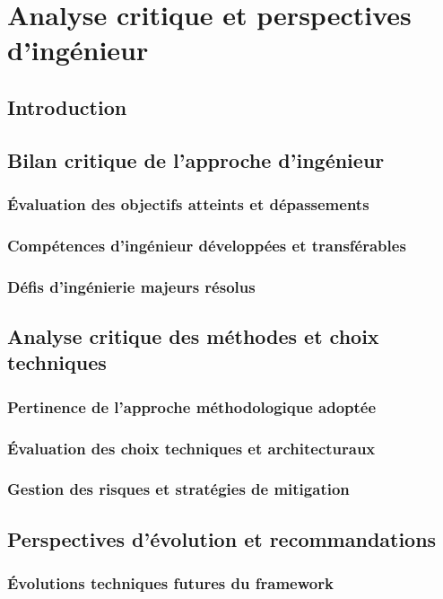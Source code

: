 \chapter{Analyse critique et perspectives d'ingénieur}

\section{Introduction}

\section{Bilan critique de l'approche d'ingénieur}
\subsection{Évaluation des objectifs atteints et dépassements}
\subsection{Compétences d'ingénieur développées et transférables}
\subsection{Défis d'ingénierie majeurs résolus}

\section{Analyse critique des méthodes et choix techniques}
\subsection{Pertinence de l'approche méthodologique adoptée}
\subsection{Évaluation des choix techniques et architecturaux}
\subsection{Gestion des risques et stratégies de mitigation}

\section{Perspectives d'évolution et recommandations}
\subsection{Évolutions techniques futures du framework}
